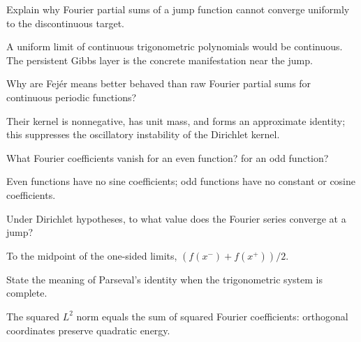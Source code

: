 \begin{problem}\label{prob:iii09-problem-03}
Explain why Fourier partial sums of a jump function cannot converge uniformly to the discontinuous target.
\end{problem}
\begin{solution}
A uniform limit of continuous trigonometric polynomials would be continuous.
The persistent Gibbs layer is the concrete manifestation near the jump.
\end{solution}

\begin{problem}\label{prob:iii09-problem-04}
Why are Fejér means better behaved than raw Fourier partial sums for continuous periodic functions?
\end{problem}
\begin{solution}
Their kernel is nonnegative, has unit mass, and forms an approximate
identity; this suppresses the oscillatory instability of the Dirichlet kernel.
\end{solution}

\begin{problem}\label{prob:iii09-problem-05}
What Fourier coefficients vanish for an even function? for an odd function?
\end{problem}
\begin{solution}
Even functions have no sine coefficients; odd functions have no constant
or cosine coefficients.
\end{solution}

\begin{problem}\label{prob:iii09-problem-06}
Under Dirichlet hypotheses, to what value does the Fourier series converge at a jump?
\end{problem}
\begin{solution}
To the midpoint of the one-sided limits,
\((f(x^-)+f(x^+))/2\).
\end{solution}

\begin{problem}\label{prob:iii09-problem-07}
State the meaning of Parseval's identity when the trigonometric system is complete.
\end{problem}
\begin{solution}
The squared \(L^2\) norm equals the sum of squared Fourier coefficients:
orthogonal coordinates preserve quadratic energy.
\end{solution}

